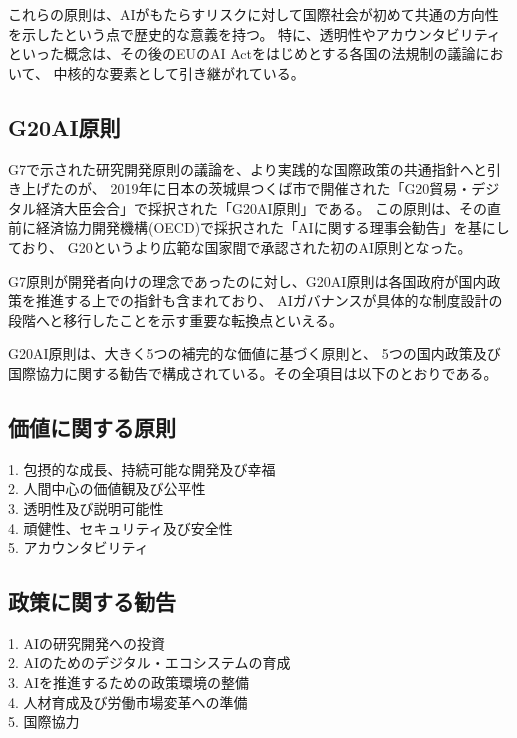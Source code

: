 これらの原則は、AIがもたらすリスクに対して国際社会が初めて共通の方向性を示したという点で歴史的な意義を持つ。
特に、透明性やアカウンタビリティといった概念は、その後のEUのAI Actをはじめとする各国の法規制の議論において、
中核的な要素として引き継がれている。


\subsection{G20AI原則}
G7で示された研究開発原則の議論を、より実践的な国際政策の共通指針へと引き上げたのが、
2019年に日本の茨城県つくば市で開催された「G20貿易・デジタル経済大臣会合」で採択された「G20AI原則」である。
この原則は、その直前に経済協力開発機構(OECD)で採択された「AIに関する理事会勧告」を基にしており、
G20というより広範な国家間で承認された初のAI原則となった。

G7原則が開発者向けの理念であったのに対し、G20AI原則は各国政府が国内政策を推進する上での指針も含まれており、
AIガバナンスが具体的な制度設計の段階へと移行したことを示す重要な転換点といえる。

G20AI原則は、大きく5つの補完的な価値に基づく原則と、
5つの国内政策及び国際協力に関する勧告で構成されている。その全項目は以下のとおりである。

\subsection*{価値に関する原則} %
\begin{description}
  \item[1. 包摂的な成長、持続可能な開発及び幸福]
  \item[2. 人間中心の価値観及び公平性]
  \item[3. 透明性及び説明可能性]
  \item[4. 頑健性、セキュリティ及び安全性]
  \item[5. アカウンタビリティ]
\end{description}

\subsection*{政策に関する勧告}
\begin{description}
  \item[1. AIの研究開発への投資]
  \item[2. AIのためのデジタル・エコシステムの育成]
  \item[3. AIを推進するための政策環境の整備]
  \item[4. 人材育成及び労働市場変革への準備]
  \item[5. 国際協力]
\end{description}


